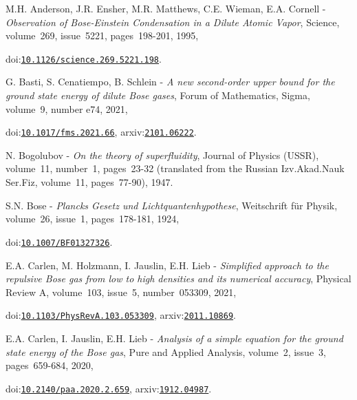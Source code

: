 M.H. Anderson, J.R. Ensher, M.R. Matthews, C.E. Wieman, E.A. Cornell - {\it Observation of Bose-Einstein Condensation in a Dilute Atomic Vapor}, Science, volume\-~269, issue\-~5221, pages\-~198-201, 1995,\par{}
doi:{\tt\color{blue}\href{http://dx.doi.org/10.1126/science.269.5221.198}{10.1126/science.269.5221.198}}.\par\medskip
 
G. Basti, S. Cenatiempo, B. Schlein - {\it A new second-order upper bound for the ground state energy of dilute Bose gases}, Forum of Mathematics, Sigma, volume\-~9, number e74, 2021,\par{}
doi:{\tt\color{blue}\href{http://dx.doi.org/10.1017/fms.2021.66}{10.1017/fms.2021.66}}, arxiv:{\tt\color{blue}\href{http://arxiv.org/abs/2101.06222}{2101.06222}}.\par\medskip
 
N. Bogolubov - {\it On the theory of superfluidity}, Journal of Physics (USSR), volume\-~11, number\-~1, pages\-~23-32 (translated from the Russian Izv.Akad.Nauk Ser.Fiz, volume\-~11, pages\-~77-90), 1947.\par\medskip
 
S.N. Bose - {\it Plancks Gesetz und Lichtquantenhypothese}, Weitschrift f\"ur Physik, volume\-~26, issue\-~1, pages\-~178-181, 1924,\par{}
doi:{\tt\color{blue}\href{http://dx.doi.org/10.1007/BF01327326}{10.1007/BF01327326}}.\par\medskip
 
E.A. Carlen, M. Holzmann, I. Jauslin, E.H. Lieb - {\it Simplified approach to the repulsive Bose gas from low to high densities and its numerical accuracy}, Physical Review A, volume\-~103, issue\-~5, number\-~053309, 2021,\par{}
doi:{\tt\color{blue}\href{http://dx.doi.org/10.1103/PhysRevA.103.053309}{10.1103/PhysRevA.103.053309}}, arxiv:{\tt\color{blue}\href{http://arxiv.org/abs/2011.10869}{2011.10869}}.\par\medskip
 
E.A. Carlen, I. Jauslin, E.H. Lieb - {\it Analysis of a simple equation for the ground state energy of the Bose gas}, Pure and Applied Analysis, volume\-~2, issue\-~3, pages\-~659-684, 2020,\par{}
doi:{\tt\color{blue}\href{http://dx.doi.org/10.2140/paa.2020.2.659}{10.2140/paa.2020.2.659}}, arxiv:{\tt\color{blue}\href{http://arxiv.org/abs/1912.04987}{1912.04987}}.\par\medskip
 
